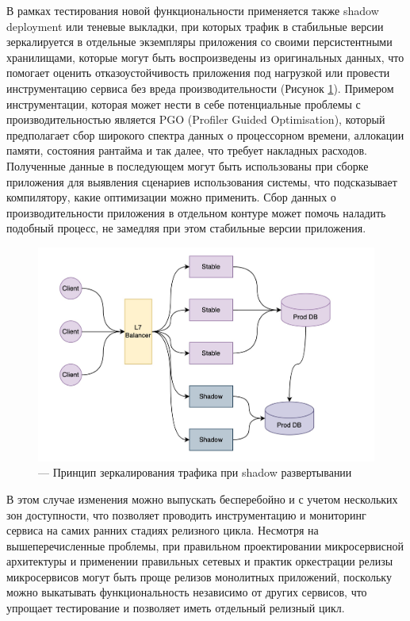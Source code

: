 В рамках тестирования новой функциональности применяется также sha\-dow deployment или теневые выкладки,
при которых трафик в стабильные версии зеркалируется в отдельные экземпляры приложения со своими персистентными хранилищами,
которые могут быть воспроизведены из оригинальных данных, что помогает оценить отказоустойчивость
приложения под нагрузкой или провести инструментацию сервиса без вреда производительности (Рисунок \ref{fig:shadow}).
Примером инструментации, которая может нести в себе потенциальные проблемы с производительностью
является PGO (Profiler Guided Optimisation), который предполагает сбор широкого спектра данных о
процессорном времени, аллокации памяти, состояния рантайма и так далее, что требует накладных расходов.
Полученные данные в последующем могут быть использованы при сборке приложения для выявления сценариев
использования системы, что подсказывает компилятору, какие оптимизации можно применить.
Сбор данных о производительности приложения в отдельном контуре может помочь наладить подобный процесс, не замедляя
при этом стабильные версии приложения.
\begin{figure}[H]
    \centering
    \includegraphics[width=0.8\linewidth]{img/shadow.jpg}
    \caption{--- Принцип зеркалирования трафика при shadow развертывании}
    \label{fig:shadow}
\end{figure}

В этом случае изменения можно выпускать бесперебойно и с учетом нескольких зон
доступности, что позволяет проводить инструментацию и мониторинг сервиса на самих ранних стадиях релизного цикла.
Несмотря на вышеперечисленные проблемы, при правильном проектировании микросервисной архитектуры и применении правильных сетевых и практик оркестрации 
релизы микросервисов могут быть проще релизов монолитных приложений, поскольку можно выкатывать функциональность независимо от других 
сервисов, что упрощает тестирование и позволяет иметь отдельный релизный цикл.

